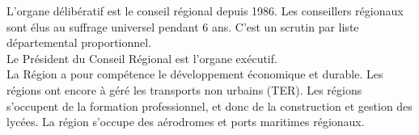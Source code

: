 \documentclass[12pt, a4paper, openany]{book}
\begin{document}
L'organe délibératif est le conseil régional depuis 1986. Les conseillers régionaux sont élus au suffrage universel pendant 6 ans. C'est un scrutin par liste départemental proportionnel. \\
Le Président du Conseil Régional est l'organe exécutif. \\
La Région a pour compétence le développement économique et durable. Les régions ont encore à géré les transports non urbains (TER). Les régions s'occupent de la formation professionnel, et donc de la construction et gestion des lycées. La région s'occupe des aérodromes et ports maritimes régionaux.
\end{document}
